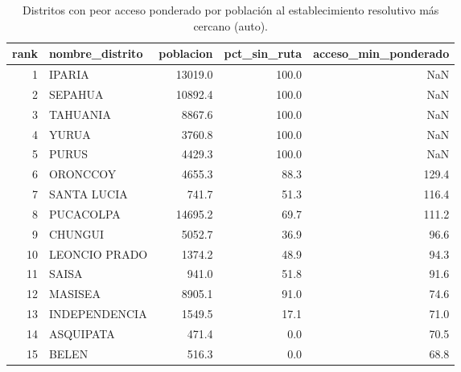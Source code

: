 \begin{table}
\caption{Distritos con peor acceso ponderado por población al establecimiento resolutivo más cercano (auto).}
\label{tab:brechas}
\begin{tabular}{rlrrr}
\toprule
rank & nombre\_distrito & poblacion & pct\_sin\_ruta & acceso\_min\_ponderado \\
\midrule
1 & IPARIA & 13019.0 & 100.0 & NaN \\
2 & SEPAHUA & 10892.4 & 100.0 & NaN \\
3 & TAHUANIA & 8867.6 & 100.0 & NaN \\
4 & YURUA & 3760.8 & 100.0 & NaN \\
5 & PURUS & 4429.3 & 100.0 & NaN \\
6 & ORONCCOY & 4655.3 & 88.3 & 129.4 \\
7 & SANTA LUCIA & 741.7 & 51.3 & 116.4 \\
8 & PUCACOLPA & 14695.2 & 69.7 & 111.2 \\
9 & CHUNGUI & 5052.7 & 36.9 & 96.6 \\
10 & LEONCIO PRADO & 1374.2 & 48.9 & 94.3 \\
11 & SAISA & 941.0 & 51.8 & 91.6 \\
12 & MASISEA & 8905.1 & 91.0 & 74.6 \\
13 & INDEPENDENCIA & 1549.5 & 17.1 & 71.0 \\
14 & ASQUIPATA & 471.4 & 0.0 & 70.5 \\
15 & BELEN & 516.3 & 0.0 & 68.8 \\
\bottomrule
\end{tabular}
\end{table}
